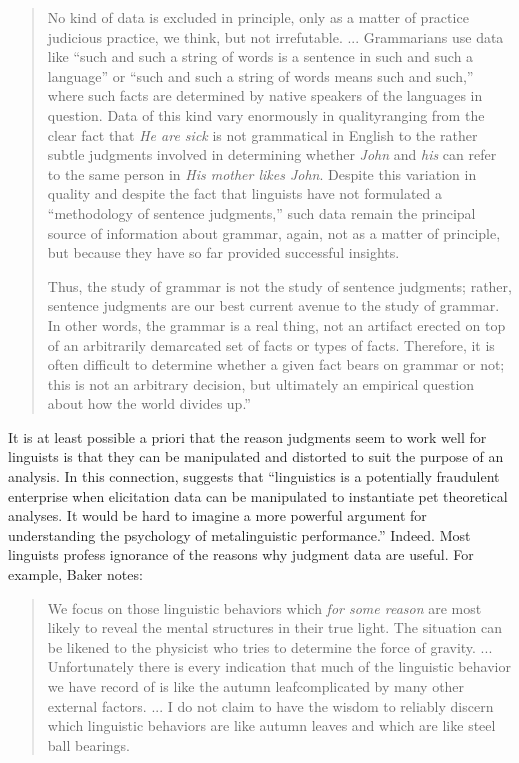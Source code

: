 \begin{quote}
No kind of data is excluded in principle, only as a matter of practice \schdash{} judicious practice, we think, but not irrefutable. ... Grammarians use data like ``such and such a string of words is a sentence in such and such a language'' or ``such and such a string of words means such and such,'' where such facts are determined by native speakers of the languages in question. Data of this kind vary enormously in quality\schdash{}ranging from the clear fact that \textit{He are sick} is not grammatical in English to the rather subtle judgments involved in determining whether \textit{John} and \textit{his} can refer to the same person in \textit{His mother likes John}. Despite this variation in quality and despite the fact that linguists have not formulated a ``methodology of sentence judgments,'' such data remain the principal source of information about grammar, again, not as a matter of principle, but because they have so far provided successful insights.

Thus, the study of grammar is not the study of sentence judgments; rather, sentence judgments are our best current avenue to the study of grammar. In other words, the grammar is a real thing, not an artifact erected on top of an arbitrarily demarcated set of facts or types of facts. Therefore, it is often difficult to determine whether a given fact bears on grammar or not; this is not an arbitrary decision, but ultimately an empirical question about how the world divides up.''   \citep[2]{vanRiemsdijk1986}
\end{quote}

\noindent
It is at least possible a priori that the reason judgments seem to work well for linguists is that they can be manipulated and distorted to suit the purpose of an analysis. In this connection, \citep[82]{Birdsong1989} suggests that ``linguistics is a potentially fraudulent enterprise when elicitation data can be manipulated to instantiate pet theoretical analyses. It would be hard to imagine a more powerful argument for understanding the psychology of metalinguistic performance.'' Indeed. Most linguists profess ignorance of the reasons why judgment data are useful. For example, Baker notes:

\begin{quote}
We focus on those linguistic behaviors which \textit{for some reason} are most likely to reveal the mental structures in their true light. The situation can be likened to the physicist who tries to determine the force of gravity. ... Unfortunately there is every indication that much of the linguistic behavior we have record of is like the autumn leaf\schdash{}complicated by many other external factors. ... I do not claim to have the wisdom to reliably discern which linguistic behaviors are like autumn leaves and which are like steel ball bearings. \citep[29]{Baker1988}
\end{quote}

